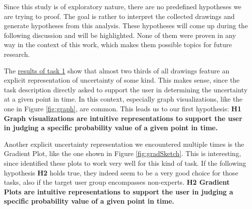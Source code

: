 Since this study is of exploratory nature, there are no predefined hypotheses we are trying to proof. The goal is rather to interpret the collected drawings and generate hypotheses from this analysis. These hypotheses will come up during the following discussion and will be highlighted. None of them were proven in any way in the context of this work, which makes them possible topics for future research. \par \medskip

The \hyperref[tb:t1]{results of task 1} show that almost two thirds of all drawings feature an explicit representation of uncertainty of some kind. This makes sense, since the task description directly asked to support the user in determining the uncertainty at a given point in time. In this context, especially graph visualizations, like the one in Figure \ref{fig:graph}, are common. This leads us to our first hypothesis: \textbf{H1 Graph visualizations are intuitive representations to support the user in judging a specific probability value of a given point in time.} \par \medskip

Another explicit uncertainty representation we encountered multiple times is the Gradient Plot, like the one shown in Figure \ref{fig:gradSketch}. This is interesting, since \citet{gschwandtner2016visual} identified these plots to work very well for this kind of task. If the following hypothesis \textbf{H2} holds true, they indeed seem to be a very good choice for those tasks, also if the target user group encompasses non-experts. \textbf{H2 Gradient Plots are intuitive representations to support the user in judging a specific probability value of a given point in time.}\par \medskip

